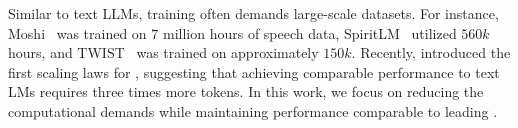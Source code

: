 Similar to text \ac{LLMs}, training \slms often demands large-scale datasets. For instance, Moshi~\cite{defossez2024moshi} was trained on $7$ million hours of speech data, SpiritLM~\cite{spiritlm} utilized $560k$ hours, and TWIST~\cite{twist} was trained on approximately $150k$. Recently, \citet{cuervo2024scaling} introduced the first scaling laws for \slms, suggesting that achieving comparable performance to text LMs requires three times more tokens. In this work, we focus on reducing the computational demands while maintaining performance comparable to leading \slms.